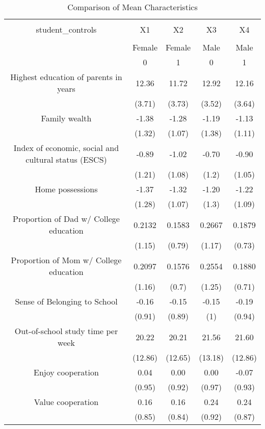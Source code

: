 
\begin{table}[!htbp] \centering 
  \caption{Comparison of Mean Characteristics} 
  \label{Tab1} 
\scriptsize 
\begin{tabular}{@{\extracolsep{5pt}} ccccc} 
\\[-1.8ex]\hline 
\hline \\[-1.8ex] 
student\_controls & X1 & X2 & X3 & X4 \\ 
\hline \\[-1.8ex] 
 & Female & Female & Male & Male \\ 
 & 0 & 1 & 0 & 1 \\ 
Highest education of parents in years  & 12.36 & 11.72 & 12.92 & 12.16 \\ 
 & (3.71) & (3.73) & (3.52) & (3.64) \\ 
Family wealth & -1.38 & -1.28 & -1.19 & -1.13 \\ 
 & (1.32) & (1.07) & (1.38) & (1.11) \\ 
Index of economic, social and cultural status (ESCS) & -0.89 & -1.02 & -0.70 & -0.90 \\ 
 & (1.21) & (1.08) & (1.2) & (1.05) \\ 
Home possessions & -1.37 & -1.32 & -1.20 & -1.22 \\ 
 & (1.28) & (1.07) & (1.3) & (1.09) \\ 
Proportion of Dad w/ College education & 0.2132 & 0.1583 & 0.2667 & 0.1879 \\ 
 & (1.15) & (0.79) & (1.17) & (0.73) \\ 
Proportion of Mom w/ College education & 0.2097 & 0.1576 & 0.2554 & 0.1880 \\ 
 & (1.16) & (0.7) & (1.25) & (0.71) \\ 
Sense of Belonging to School & -0.16 & -0.15 & -0.15 & -0.19 \\ 
 & (0.91) & (0.89) & (1) & (0.94) \\ 
Out-of-school study time per week & 20.22 & 20.21 & 21.56 & 21.60 \\ 
 & (12.86) & (12.65) & (13.18) & (12.86) \\ 
Enjoy cooperation &  0.04 &  0.00 &  0.00 & -0.07 \\ 
 & (0.95) & (0.92) & (0.97) & (0.93) \\ 
Value cooperation & 0.16 & 0.16 & 0.24 & 0.24 \\ 
 & (0.85) & (0.84) & (0.92) & (0.87) \\ 

\end{tabular}
\end{table}
